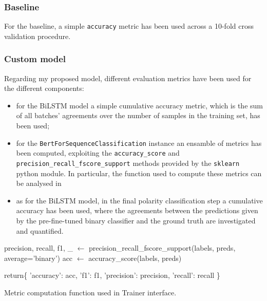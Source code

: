 \subsubsection{Baseline}
For the baseline, a simple \texttt{accuracy} metric has been used across a 10-fold cross validation procedure.
\vspace{-.5em}
\subsubsection{Custom model}
Regarding my proposed model, different evaluation metrics have been used for the different components:
\begin{itemize}
    \item for the BiLSTM model a simple cumulative accuracy metric, which is the sum of all batches' agreements over the number of samples in the training set, has been used;
    \item for the \texttt{BertForSequenceClassification} instance an ensamble of metrics has been computed, exploiting the 
    \texttt{accuracy\_score} and \texttt{precision\_recall\_fscore\_support} methods provided by the \texttt{sklearn} python module. 
    In particular, the function used to compute these metrics can be analysed in \textbf{}
    \item as for the BiLSTM model, in the final polarity classification step a cumulative accuracy has been used, where the agreements
    between the predictions given by the pre-fine-tuned binary classifier and the ground truth are investigated and quantified.
\end{itemize}

\vspace{-1.0em}
\begin{algorithm}[!h]
    \SetAlgoLined
    \DontPrintSemicolon
    \CommentSty{\color{blue}}
    precision, recall, f1, \_  $\gets$ precision\_recall\_fscore\_support(labels, preds, average='binary')\;
    acc $\gets$ accuracy\_score(labels, preds)\;

    return\{
            'accuracy': acc,\;
            \hspace{10mm}'f1': f1,\;
            \hspace{10mm}'precision': precision,\;
            \hspace{10mm}'recall': recall
        \}

\caption{Metric computation function used in Trainer interface.}
\label{alg:binaryclf}

\end{algorithm}

